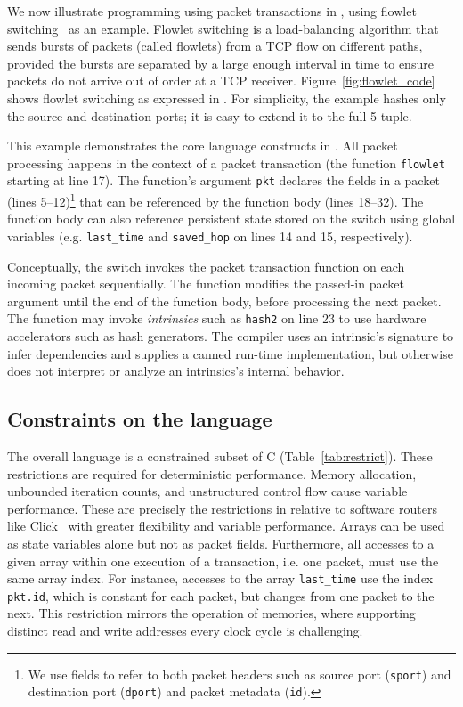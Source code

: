 We now illustrate programming using packet transactions in \pktlanguage, using
flowlet switching~\cite{flowlets} as an example. Flowlet switching is a
load-balancing algorithm that sends bursts of packets (called flowlets) from a
TCP flow on different paths, provided the bursts are separated by a large
enough interval in time to ensure packets do not arrive out of order at a TCP
receiver. Figure~\ref{fig:flowlet_code} shows flowlet switching as expressed in
\pktlanguage. For simplicity, the example hashes only the source and
destination ports; it is easy to extend it to the full 5-tuple.

This example demonstrates the core language constructs in \pktlanguage. All
packet processing happens in the context of a packet transaction (the function
\texttt{flowlet} starting at line 17). The function's argument {\tt pkt}
declares the fields in a packet (lines 5--12)\footnote{We use fields to refer
to both packet headers such as source port ({\tt sport}) and destination port
({\tt dport}) and packet metadata ({\tt id}).} that can be referenced by the
function body (lines 18--32).  The function body can also reference
persistent state stored on the switch using global variables (e.g.
\texttt{last\_time} and \texttt{saved\_hop} on lines 14 and 15,
respectively).

Conceptually, the switch invokes the packet transaction function on each
incoming packet sequentially. The function modifies the passed-in packet
argument until the end of the function body, before processing the next packet.
The function may invoke \textit{intrinsics} such
as \texttt{hash2} on line 23 to use hardware accelerators such as hash generators.
The \pktlanguage compiler uses an intrinsic's
signature to infer dependencies and supplies a canned run-time implementation,
but otherwise does not interpret or analyze an intrinsics's internal behavior.

\subsection{Constraints on the language}

The overall language is
a constrained subset of C (Table~\ref{tab:restrict}).
These restrictions are required for deterministic performance.  Memory allocation, unbounded
iteration counts, and unstructured control flow cause variable performance.
These are precisely the restrictions in \pktlanguage relative to software
routers like Click~\cite{click} with greater flexibility and variable
performance. Arrays can be used as state
variables alone but not as packet fields.  Furthermore, all accesses to a given
array within one execution of a transaction, i.e. one packet, must use the same
array index. For instance, accesses to the array \texttt{last\_time} use
the index \texttt{pkt.id}, which is constant for each packet, but changes from
one packet to the next. This restriction mirrors the operation of memories,
where supporting distinct read and write addresses every clock cycle is challenging.


